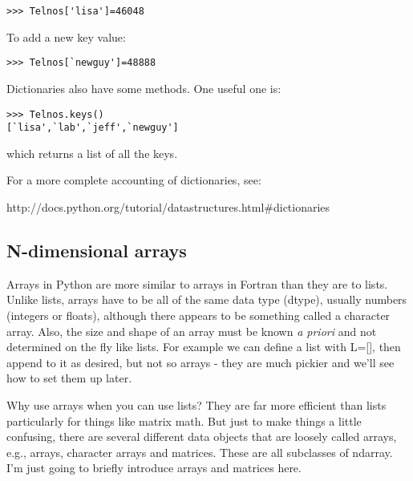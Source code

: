 {{\singlespacing \color{blue} \begin{verbatim}
>>> Telnos['lisa']=46048
\end{verbatim}}


\noindent
To add a new key value:
{\singlespacing \color{blue} \begin{verbatim}
>>> Telnos[`newguy']=48888
\end{verbatim}}


\noindent
 Dictionaries also have some methods.
One useful one is:
{\singlespacing \color{blue} \begin{verbatim}
>>> Telnos.keys()
[`lisa',`lab',`jeff',`newguy']
\end{verbatim}}

\noindent
which returns a list of all the keys.  

For a more complete accounting of dictionaries,  see: 

http://docs.python.org/tutorial/datastructures.html\#dictionaries



\subsection{N-dimensional arrays}

Arrays  in Python  are more similar to arrays in Fortran than they are to  lists.
Unlike lists,   arrays have to be all of the same data type (dtype), usually numbers (integers or floats), although there appears to be something called a character array.  Also, the size and shape of an array must be known {\it a priori} and not determined on the fly like lists. For example we can define a list with {\color{blue}L=[]}, then append to it as desired, but not so arrays - they are much pickier and we'll see how to set them up later.  

Why use arrays when you can use lists?  They are far more efficient than lists particularly for things like matrix math.   But just to make things a little confusing, there are  several different data objects that are loosely called arrays, e.g., arrays, character arrays and matrices.  These are all subclasses of ndarray.  I'm just going to briefly introduce arrays and matrices here.  

}
